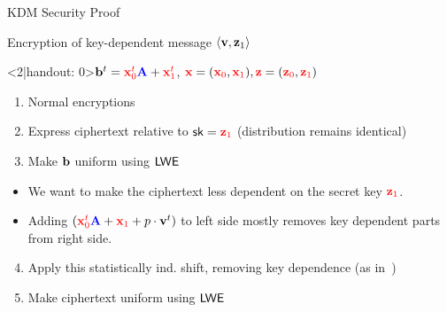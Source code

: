 \begin{frame}{KDM Security Proof}
\begin{block}{Encryption of key-dependent message $\langle{\ensuremath{\mathbf{v}},
        \ensuremath{\mathbf{z}}_1}\rangle$}
\begin{overlayarea}{\textwidth}{2cm}
    \onslide*<2|handout:
    0>{$\mathbf{b}^{t}={\color{red} \mathbf{x}_0^{t}}{\color{blue} \mathbf{A}}+{\color{red} \mathbf{x}_1^{t}}$,
      ${\color{red} \mathbf{x}}=({\color{red} \mathbf{x}_0}, {\color{red} \mathbf{x}_1}),
    {\color{red} \mathbf{z}}=({\color{red} \mathbf{z}_0}, {\color{red} \mathbf{z}_1})$}
      \end{overlayarea}
  \end{block}
  \smallskip
    \begin{enumerate}
    \item<1-> Normal encryptions
    \item<2-> Express ciphertext relative to $\mathsf{sk}={\color{red} \mathbf{z}_{1}}$ (distribution remains identical)
    \item<3->  Make $\mathbf{b}$ uniform using $\textsf{LWE}$
    \end{enumerate}
      \begin{itemize}
        \item<4-> We want to make the ciphertext less dependent on the
          secret key ${\color{red} \mathbf{z}_1}$.
        \item<4-> Adding
          $({\color{red} \mathbf{x}_0^t}{\color{blue} \mathbf{A}}+{\color{red} \mathbf{x}_1}+p\cdot
          \mathbf{v}^t)$ to left side mostly removes key dependent parts from
          right side.
      \end{itemize}
     \begin{enumerate}
       \setcounter{enumi}{3}
    \item<5-> Apply this statistically ind. shift, removing key dependence (as in~)
    \item <6-> Make ciphertext uniform using $\textsf{LWE}$
    \end{enumerate}
\end{frame}

